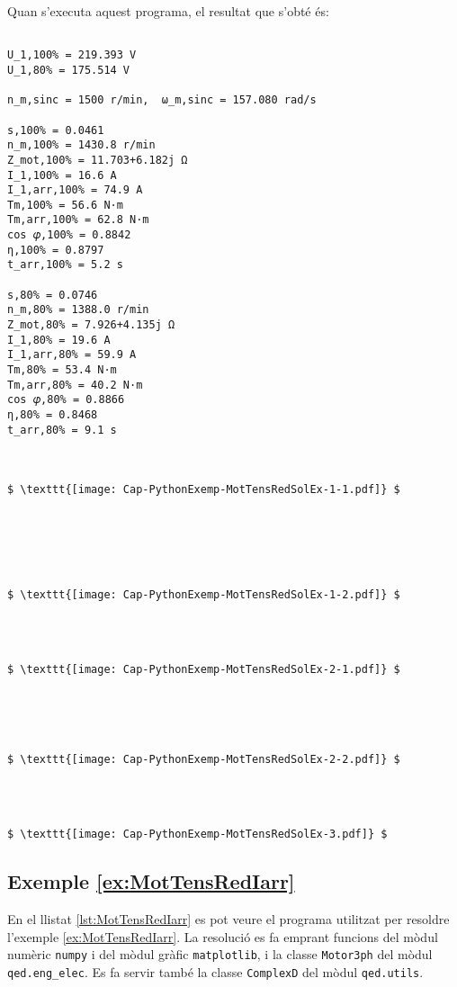 Quan s'executa aquest programa, el resultat que s'obté és:
\lstset{
	language=,
	numbers=none,
	frame=none
}
\begin{lstlisting}[mathescape=true]
	
U_1,100% = 219.393 V
U_1,80% = 175.514 V

n_m,sinc = 1500 r/min,  ω_m,sinc = 157.080 rad/s

s,100% = 0.0461
n_m,100% = 1430.8 r/min
Z_mot,100% = 11.703+6.182j Ω
I_1,100% = 16.6 A
I_1,arr,100% = 74.9 A
Tm,100% = 56.6 N·m
Tm,arr,100% = 62.8 N·m
cos 𝜑,100% = 0.8842
η,100% = 0.8797
t_arr,100% = 5.2 s

s,80% = 0.0746
n_m,80% = 1388.0 r/min
Z_mot,80% = 7.926+4.135j Ω
I_1,80% = 19.6 A
I_1,arr,80% = 59.9 A
Tm,80% = 53.4 N·m
Tm,arr,80% = 40.2 N·m
cos 𝜑,80% = 0.8866
η,80% = 0.8468
t_arr,80% = 9.1 s



$ \texttt{[image: Cap-PythonExemp-MotTensRedSolEx-1-1.pdf]} $






$ \texttt{[image: Cap-PythonExemp-MotTensRedSolEx-1-2.pdf]} $




$ \texttt{[image: Cap-PythonExemp-MotTensRedSolEx-2-1.pdf]} $





$ \texttt{[image: Cap-PythonExemp-MotTensRedSolEx-2-2.pdf]} $




$ \texttt{[image: Cap-PythonExemp-MotTensRedSolEx-3.pdf]} $
\end{lstlisting} 



\hypertarget{exemple:MotTensRedIarr}{\subsection{Exemple \ref*{ex:MotTensRedIarr} \MotTensRedIarr}}
En el llistat \vref{lst:MotTensRedIarr} es pot veure el programa utilitzat per resoldre l'exemple \vref{ex:MotTensRedIarr}. La resolució es fa emprant funcions del mòdul numèric \texttt{numpy} i del mòdul gràfic \texttt{matplotlib}, i la classe \texttt{Motor3ph} del mòdul \texttt{qed.eng\_elec}.  Es fa servir també la classe \texttt{ComplexD} del mòdul \texttt{qed.utils}.


